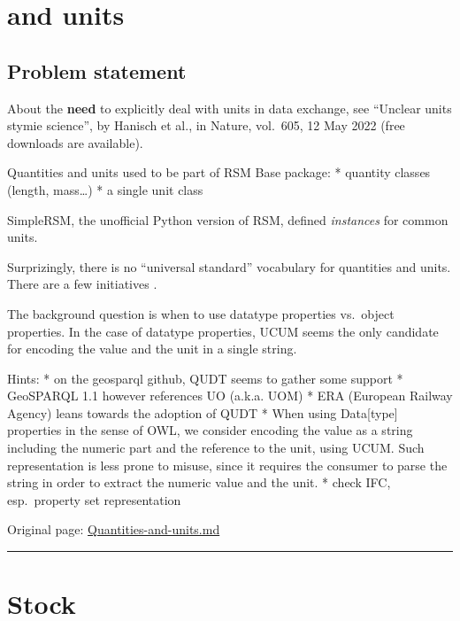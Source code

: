 \documentclass[
  11pt,
]{article}
\begin{document}
\hypertarget{and-units}{%
\section{and units}\label{and-units}}

\hypertarget{problem-statement-1}{%
\subsection{Problem statement}\label{problem-statement-1}}

About the \textbf{need} to explicitly deal with units in data exchange,
see ``Unclear units stymie science'', by Hanisch et al., in Nature,
vol.~605, 12 May 2022 (free downloads are available).

Quantities and units used to be part of RSM Base package: * quantity
classes (length, mass\ldots) * a single unit class

SimpleRSM, the unofficial Python version of RSM, defined
\emph{instances} for common units.

Surprizingly, there is no ``universal standard'' vocabulary for
quantities and units. There are a few initiatives .

The background question is when to use datatype properties vs.~object
properties. In the case of datatype properties, UCUM seems the only
candidate for encoding the value and the unit in a single string.

Hints: * on the geosparql github, QUDT seems to gather some support *
GeoSPARQL 1.1 however references UO (a.k.a. UOM) * ERA (European Railway
Agency) leans towards the adoption of QUDT * When using Data{[}type{]}
properties in the sense of OWL, we consider encoding the value as a
string including the numeric part and the reference to the unit, using
UCUM. Such representation is less prone to misuse, since it requires the
consumer to parse the string in order to extract the numeric value and
the unit. * check IFC, esp.~property set representation

Original page:
\href{https://github.com/UICrail/CDM-RSM/wiki/Quantities-and-units}{Quantities-and-units.md}

\begin{center}\rule{0.5\linewidth}{0.5pt}\end{center}

\hypertarget{stock}{%
\section{Stock}\label{stock}}
\end{document}

